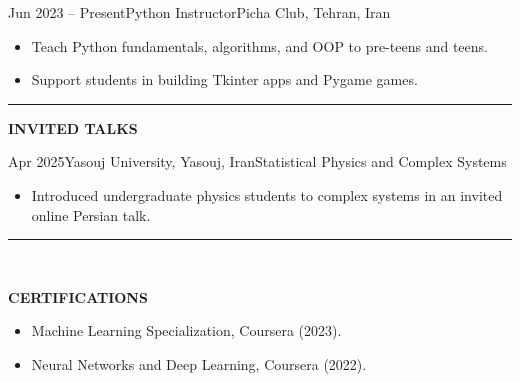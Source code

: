 \documentclass[12pt, b4paper]{cv}
\begin{document}
\vspace{-0.1in}

\begin{work}{Jun 2023 -- Present}{Python Instructor}{Picha Club, Tehran, Iran}
\vspace{-0.1in}
\begin{itemize}
		\item Teach Python fundamentals, algorithms, and OOP to pre-teens and teens.
		\item Support students in building Tkinter apps and Pygame games.
	\end{itemize}
\end{work}




\vspace{-0.15in}
\rule{\textwidth}{1pt}
\vspace{-0.15in}



{\Large \textbf{INVITED TALKS}}
\vspace{0.1in}

\begin{school}{Apr 2025}{Yasouj University, Yasouj, Iran}{Statistical Physics and Complex Systems}
\vspace{-0.1in}
\begin{itemize}
	\item Introduced undergraduate physics students to complex systems in an invited online Persian talk.
\end{itemize}
\end{school}



\vspace{-0.15in}
\rule{\textwidth}{1pt}\\
\vspace{-0.15in}

{\Large \textbf{CERTIFICATIONS}}
\vspace{-5pt}

\begin{itemize}
	\item Machine Learning Specialization, Coursera (2023).
	\item Neural Networks and Deep Learning, Coursera (2022).
\end{itemize}
\end{document}
